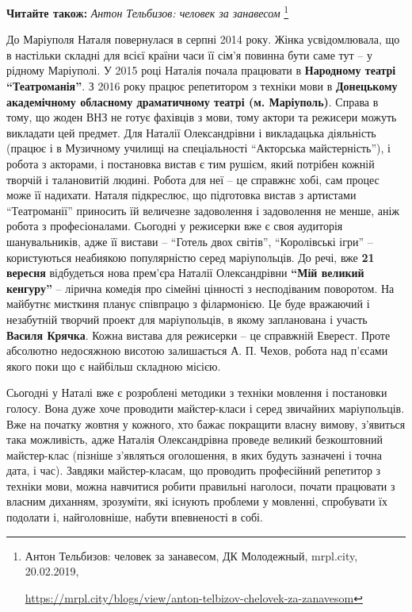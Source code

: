 \textbf{Читайте також:} \emph{Антон Тельбизов: человек за занавесом}%
\footnote{Антон Тельбизов: человек за занавесом, ДК Молодежный, mrpl.city, 20.02.2019, \par%
\url{https://mrpl.city/blogs/view/anton-telbizov-chelovek-za-zanavesom}
}

До Маріуполя Наталя повернулася в серпні 2014 року. Жінка усвідомлювала, що в
настільки складні для всієї країни часи її сім'я повинна бути саме тут – у
рідному Маріуполі. У 2015 році Наталія почала працювати в \textbf{Народному театрі
\enquote{Театроманія}}. З 2016 року працює репетитором з техніки мови в \textbf{Донецькому
академічному обласному драматичному театрі (м. Маріуполь)}. Справа в тому, що
жоден ВНЗ не готує фахівців з мови, тому актори та режисери можуть викладати
цей предмет. Для Наталії Олександрівни і викладацька діяльність (працює і в
Музичному училищі на спеціальності \enquote{Акторська майстерність}), і робота з
акторами, і постановка вистав є тим рушієм, який потрібен кожній творчій і
талановитій людині. Робота для неї – це справжнє хобі, сам процес може її
надихати. Наталя підкреслює, що підготовка вистав з артистами \enquote{Театроманії}
приносить їй величезне задоволення і задоволення не менше, аніж робота з
професіоналами. Сьогодні у режисерки вже є своя аудиторія шанувальників, адже
її вистави – \enquote{Готель двох світів}, \enquote{Королівські ігри} – користуються неабиякою
популярністю серед маріупольців. До речі, вже \textbf{21 вересня} відбудеться нова
прем'єра Наталії Олександрівни \textbf{\enquote{Мій великий кенгуру}} – лірична комедія про
сімейні цінності з несподіваним поворотом. На майбутнє мисткиня планує
співпрацю з філармонією. Це буде вражаючий і незабутній творчий проект для
маріупольців, в якому запланована і участь \textbf{Василя Крячка}. Кожна вистава для
режисерки – це справжній Еверест. Проте абсолютно недосяжною висотою
залишається А. П. Чехов, робота над п'єсами якого поки що є найбільш складною
місією. 

Сьогодні у Наталі вже є розроблені методики з техніки мовлення і постановки
голосу. Вона дуже хоче проводити майстер-класи і серед звичайних маріупольців.
Вже на початку жовтня у кожного, хто бажає покращити власну вимову, з'явиться
така можливість, адже Наталія Олександрівна проведе великий безкоштовний
майстер-клас (пізніше з'являться оголошення, в яких будуть зазначені і точна
дата, і час). Завдяки майстер-класам, що проводить професійний репетитор з
техніки мови, можна навчитися робити правильні наголоси, почати працювати з
власним диханням, зрозуміти, які існують проблеми у мовленні, спробувати їх
подолати і, найголовніше, набути впевненості в собі.

